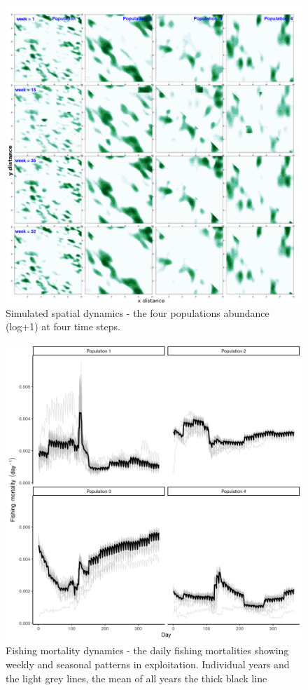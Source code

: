\documentclass[review]{elsarticle}
\begin{document}
\begin{figure}[!ht]
	\includegraphics[width = \linewidth]{Plots/pop_dist}
	\caption{Simulated spatial dynamics - the four populations abundance
		(log+1) at four time steps.
		}
	\label{fig:9}
\end{figure}	


\begin{figure}[!ht]
	\includegraphics[width = \linewidth]{Plots/f_dynamics}
	\caption{Fishing mortality dynamics - the daily fishing mortalities
		showing weekly and seasonal patterns in exploitation.
		Individual years and the light grey lines, the mean of all
		years the thick black line}
	\label{fig:10}
\end{figure}	
\end{document}
